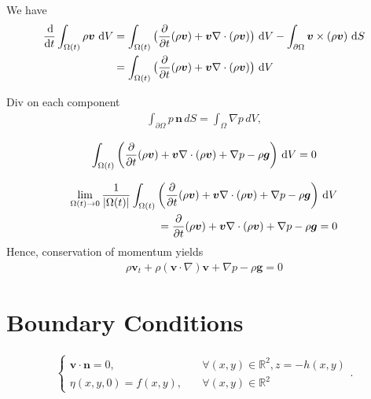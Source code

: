 \documentclass[12pt]{article}
\begin{document}
We have
\begin{align}
	\begin{aligned}
	    \frac{\operatorname{d}\!}{\operatorname{d}\! t} \int_{\Omega(t)} \rho \bm{v} \, \operatorname{d}\! V 
	        & = \int_{\Omega(t)} \big(\frac{\partial}{\partial t}(\rho \bm{v})
	                + \bm{v} \nabla \cdot (\rho \bm{v}) \big) \, \operatorname{d}\! V
	                - \int_{\partial \Omega} \bm{v} \times (\rho \bm{v}) \, \operatorname{d}\! S \\
	        & = \int_{\Omega(t)} \big(\frac{\partial}{\partial t}(\rho \bm{v})
	                + \bm{v} \nabla \cdot (\rho \bm{v}) \big) \, \operatorname{d}\! V                
	\end{aligned}
\end{align}

Div on each component
\begin{align}
    \int_{\partial \Omega} p \, \bm{n} \, d S = \int_{\Omega} \nabla p \, d V,
\end{align}

\begin{align}
    \int_{\Omega(t)} \bigg(\frac{\partial}{\partial t}(\rho \bm{v})
	                + \bm{v} \nabla \cdot (\rho \bm{v}) + \nabla p - \rho \bm{g} \bigg) \, \operatorname{d}\! V = 0
\end{align}

\begin{align}
    \lim_{\Omega(t) \rightarrow 0} \frac{1}{|\Omega(t)|}\int_{\Omega(t)} \bigg(\frac{\partial}{\partial t}(\rho \bm{v})
	                + \bm{v} \nabla \cdot (\rho \bm{v}) + \nabla p - \rho \bm{g} \bigg) \, \operatorname{d}\! V \\
	                = \frac{\partial}{\partial t}(\rho \bm{v})
	                + \bm{v} \nabla \cdot (\rho \bm{v}) + \nabla p - \rho \bm{g} = 0
\end{align}
Hence, conservation of momentum yields
\begin{align}
    \label{eq:momentumConservation}
    \rho \bm{v}_t + \rho(\bm{v} \cdot \nabla) \bm{v} + \nabla p - \rho \bm{g} = 0
\end{align}

\section{Boundary Conditions}

\begin{align}
	\begin{cases}
	    \bm{v}\cdot \bm{n} = 0,    &  \quad  \forall (x,y) \in \mathbb{R}^2, z = -h(x,y) \\
	    \eta(x,y,0) = f(x,y), &  \quad  \forall (x,y) \in \mathbb{R}^2
	\end{cases}.
\end{align}
\end{document}
